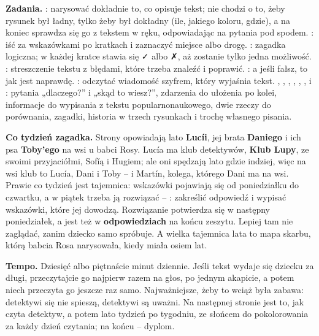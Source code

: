 \textbf{Zadania.} \textbf{\lblDibujaConLupa}: narysować dokładnie to, co
opisuje tekst; nie chodzi o to, żeby rysunek był ładny, tylko żeby był
dokładny (ile, jakiego koloru, gdzie), a na koniec sprawdza się go z
tekstem w ręku, odpowiadając na pytania pod spodem. \textbf{\lblMapa}:
iść za wskazówkami po kratkach i zaznaczyć miejsce albo drogę.
\textbf{\lblLogica}: zagadka logiczna; w każdej kratce stawia się ✓ albo
✗, aż zostanie tylko jedna możliwość. \textbf{\lblErrores}: streszczenie
tekstu z błędami, które trzeba znaleźć i poprawić.
\textbf{\lblVerdaderoFalso}: a jeśli fałsz, to jak jest naprawdę.
\textbf{\lblCodigo}: odczytać wiadomość szyfrem, który wyjaśnia tekst.
\textbf{\lblResponde}, \textbf{\lblOrdena}, \textbf{\lblRelaciona},
\textbf{\lblFicha}, \textbf{\lblCompara}, \textbf{\lblAdivina},
\textbf{\lblVinetas} i \textbf{\lblCrea}: pytania „dlaczego?” i „skąd to
wiesz?”, zdarzenia do ułożenia po kolei, informacje do wypisania z
tekstu popularnonaukowego, dwie rzeczy do porównania, zagadki, historia
w trzech rysunkach i trochę własnego pisania.

\textbf{Co tydzień zagadka.} Strony opowiadają lato \textbf{Lucíi}, jej
brata \textbf{Daniego} i ich psa \textbf{Toby'ego} na wsi u babci Rosy.
Lucía ma klub detektywów, \textbf{Klub Lupy}, ze swoimi przyjaciółmi,
Sofíą i Hugiem; ale oni spędzają lato gdzie indziej, więc na wsi klub to
Lucía, Dani i Toby -- i Martín, kolega, którego Dani ma na wsi. Prawie
co tydzień jest tajemnica: wskazówki pojawiają się od poniedziałku do
czwartku, a w piątek trzeba ją rozwiązać -- \textbf{\lblCaso}: zakreślić
odpowiedź i wypisać wskazówki, które jej dowodzą. Rozwiązanie
potwierdza się w następny poniedziałek, a jest też w
\textbf{odpowiedziach} na końcu zeszytu. Lepiej tam nie zaglądać, zanim
dziecko samo spróbuje. A wielka tajemnica lata to mapa skarbu, którą
babcia Rosa narysowała, kiedy miała osiem lat.

\textbf{Tempo.} Dziesięć albo piętnaście minut dziennie. Jeśli tekst
wydaje się dziecku za długi, przeczytajcie go najpierw razem na głos, po
jednym akapicie, a potem niech przeczyta go jeszcze raz samo.
Najważniejsze, żeby to wciąż była zabawa: detektywi się nie spieszą,
detektywi są uważni. Na następnej stronie jest to, jak czyta detektyw, a
potem lato tydzień po tygodniu, ze słońcem do pokolorowania za każdy
dzień czytania; na końcu -- dyplom.
\newpage
